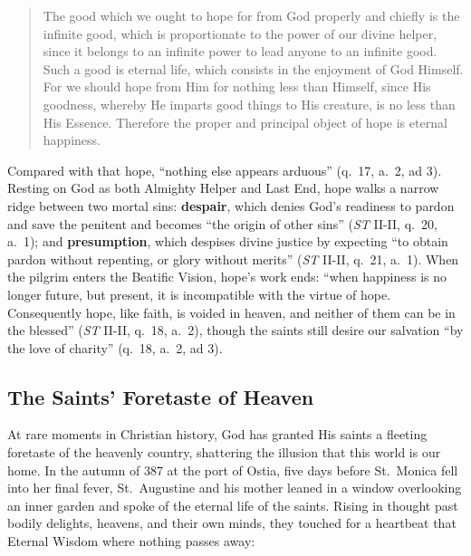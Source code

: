 \begin{quote}
The good which we ought to hope for from God properly and chiefly is the infinite good, which is proportionate to the power of our divine helper, since it belongs to an infinite power to lead anyone to an infinite good. Such a good is eternal life, which consists in the enjoyment of God Himself. For we should hope from Him for nothing less than Himself, since His goodness, whereby He imparts good things to His creature, is no less than His Essence. Therefore the proper and principal object of hope is eternal happiness.
\end{quote}

Compared with that hope, ``nothing else appears arduous'' (q.\ 17, a.\ 2, ad 3). Resting on God as both Almighty Helper and Last End, hope walks a narrow ridge between two mortal sins: \textbf{despair}, which denies God's readiness to pardon and save the penitent and becomes ``the origin of other sins'' (\textit{ST} II-II, q.\ 20, a.\ 1); and \textbf{presumption}, which despises divine justice by expecting ``to obtain pardon without repenting, or glory without merits'' (\textit{ST} II-II, q.\ 21, a.\ 1). When the pilgrim enters the Beatific Vision, hope's work ends: ``when happiness is no longer future, but present, it is incompatible with the virtue of hope. Consequently hope, like faith, is voided in heaven, and neither of them can be in the blessed'' (\textit{ST} II-II, q.\ 18, a.\ 2), though the saints still desire our salvation ``by the love of charity'' (q.\ 18, a.\ 2, ad 3).

\subsection*{The Saints' Foretaste of Heaven}

At rare moments in Christian history, God has granted His saints a fleeting foretaste of the heavenly country, shattering the illusion that this world is our home. In the autumn of 387 at the port of Ostia, five days before St.\ Monica fell into her final fever, St.\ Augustine and his mother leaned in a window overlooking an inner garden and spoke of the eternal life of the saints. Rising in thought past bodily delights, heavens, and their own minds, they touched for a heartbeat that Eternal Wisdom where nothing passes away:

